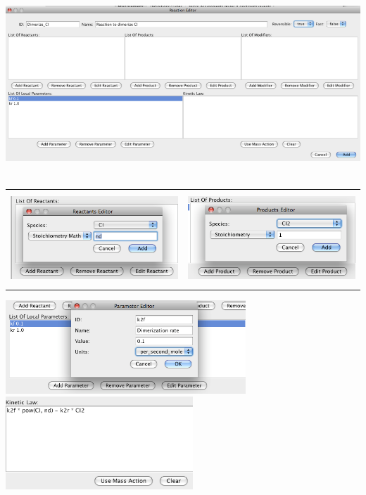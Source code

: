 \documentclass[titlepage,11pt]{article}
\begin{document}
\begin{center}
\includegraphics[height=70mm]{screenshots/reaction}
\begin{tabular}{cc}
\includegraphics[height=35mm]{screenshots/reactant} &
\includegraphics[height=35mm]{screenshots/product}
\end{tabular}
\includegraphics[height=35mm]{screenshots/localParam}\\
\includegraphics[height=35mm]{screenshots/kineticLaw} 
\end{center}
\end{document}
